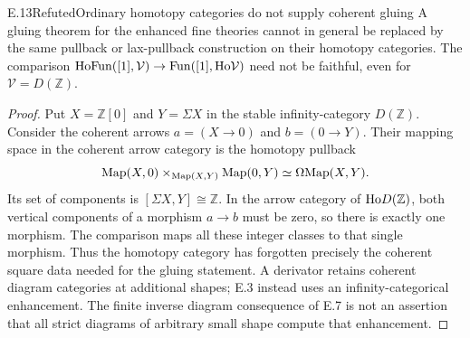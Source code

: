 \begin{claim}{E.13}{Refuted}{Ordinary homotopy categories do not supply coherent gluing}
A gluing theorem for the enhanced fine theories cannot in general be replaced by the same pullback or lax-pullback construction on their homotopy categories. The comparison $\mathrm{Ho}\mathrm{Fun}([1],\mathcal V)\to\mathrm{Fun}([1],\mathrm{Ho}\mathcal V)$ need not be faithful, even for $\mathcal V=D(\mathbb Z)$.
\end{claim}
\begin{proof}
Put $X=\mathbb Z[0]$ and $Y=\Sigma X$ in the stable infinity-category $D(\mathbb Z)$. Consider the coherent arrows $a=(X\to0)$ and $b=(0\to Y)$. Their mapping space in the coherent arrow category is the homotopy pullback
\[
 \mathrm{Map}(X,0)\times_{\mathrm{Map}(X,Y)}\mathrm{Map}(0,Y)
 \simeq\Omega\mathrm{Map}(X,Y).
\]
Its set of components is $[\Sigma X,Y]\cong\mathbb Z$. In the arrow category of $\mathrm{Ho} D(\mathbb Z)$, both vertical components of a morphism $a\to b$ must be zero, so there is exactly one morphism. The comparison maps all these integer classes to that single morphism. Thus the homotopy category has forgotten precisely the coherent square data needed for the gluing statement. A derivator retains coherent diagram categories at additional shapes; E.3 instead uses an infinity-categorical enhancement. The finite inverse diagram consequence of E.7 is not an assertion that all strict diagrams of arbitrary small shape compute that enhancement.
\end{proof}

